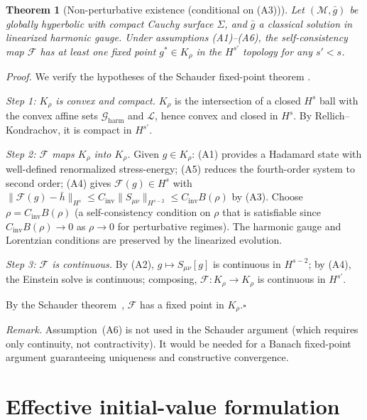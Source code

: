 \documentclass[12pt,a4paper]{article}
\newtheorem{theorem}{Theorem}
\begin{document}
\begin{theorem}[Non-perturbative existence (conditional on (A3))]
\label{thm:schauder}
Let $(\mathcal{M},\bar{g})$ be globally hyperbolic with compact Cauchy surface $\Sigma$,
and $\bar{g}$ a classical solution in linearized harmonic gauge. Under assumptions
\emph{(A1)--(A6)}, the self-consistency map $\mathcal{F}$ has at least one fixed point
$g^* \in K_\rho$ in the $H^{s'}$ topology for any $s' < s$.
\end{theorem}

\noindent\emph{Proof.} We verify the hypotheses of the Schauder fixed-point theorem
\cite{schauder}.

\smallskip\noindent\textit{Step 1: $K_\rho$ is convex and compact.} $K_\rho$ is the
intersection of a closed $H^s$ ball with the convex affine sets $\mathcal{G}_{\text{harm}}$
and $\mathcal{L}$, hence convex and closed in $H^s$. By Rellich--Kondrachov, it is compact
in $H^{s'}$.

\smallskip\noindent\textit{Step 2: $\mathcal{F}$ maps $K_\rho$ into $K_\rho$.} Given
$g\in K_\rho$: (A1) provides a Hadamard state with well-defined renormalized
stress-energy; (A5) reduces the fourth-order system to second order; (A4) gives
$\mathcal{F}(g) \in H^s$ with $\|\mathcal{F}(g)-\bar{h}\|_{H^s} \leq
C_{\text{inv}}\|S_{\mu\nu}\|_{H^{s-2}} \leq C_{\text{inv}}B(\rho)$ by (A3). Choose
$\rho = C_{\text{inv}}B(\rho)$ (a self-consistency condition on $\rho$ that is satisfiable
since $C_{\text{inv}}B(\rho)\to 0$ as $\rho\to 0$ for perturbative regimes). The harmonic
gauge and Lorentzian conditions are preserved by the linearized evolution.

\smallskip\noindent\textit{Step 3: $\mathcal{F}$ is continuous.} By (A2), $g\mapsto
S_{\mu\nu}[g]$ is continuous in $H^{s-2}$; by (A4), the Einstein solve is continuous;
composing, $\mathcal{F}: K_\rho\to K_\rho$ is continuous in $H^{s'}$.

\smallskip\noindent By the Schauder theorem~\cite{schauder}, $\mathcal{F}$ has a fixed
point in $K_\rho$.\hfill$\square$

\noindent\emph{Remark.} Assumption~(A6) is not used in the Schauder argument (which
requires only continuity, not contractivity). It would be needed for a Banach fixed-point
argument guaranteeing uniqueness and constructive convergence.

\section{Effective initial-value formulation}
\label{sec:ivp}
\end{document}
